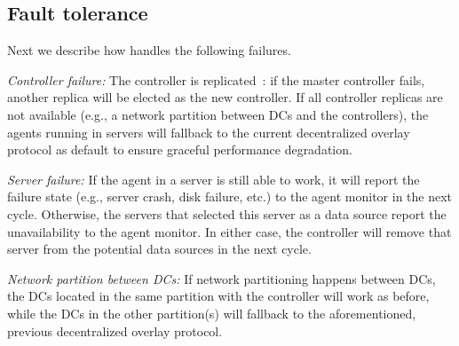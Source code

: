 \subsection{Fault tolerance}
\label{subsec:system:fault}
Next we describe how \name handles the following failures.

\begin{packedenumerate}
\item \emph{Controller failure:} The \name controller is
replicated~\cite{lamport1998part}: if the master controller fails,
another replica will be elected as the new controller. If all
controller replicas are not available (e.g., a network partition
between DCs and the controllers), the agents running in servers will
fallback to the current decentralized overlay protocol as default to
ensure graceful performance degradation.
\item \emph{Server failure:} If the agent in a server is still able to
work, it will report the failure state (e.g., server crash, disk
failure, etc.) to the agent monitor in the next cycle. Otherwise, the
servers that selected this server as a data source report the
unavailability to the agent monitor. In either case, the controller
will remove that server from the potential data sources in the next
cycle.
\item \emph{Network partition between DCs:}
If network partitioning happens between DCs, the DCs located in the same
partition with the controller will work as before, while the
DCs in the other partition(s) will fallback to the aforementioned,
previous decentralized overlay protocol.
\end{packedenumerate}



